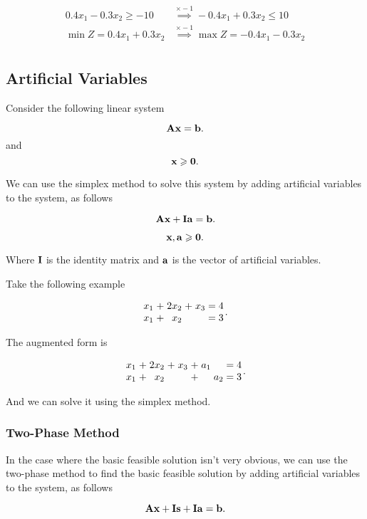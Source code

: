 \documentclass{report}
\begin{document}
\begin{align*}
	0.4x_1 - 0.3x_2 \geq -10 & \overset{\times -1}{\implies} -0.4x_1 + 0.3x_2 \leq 10  \\
	\min Z = 0.4x_1 + 0.3x_2 & \overset{\times -1}{\implies} \max Z = -0.4x_1 - 0.3x_2 \\
\end{align*}

\subsection{Artificial Variables}

Consider the following linear system

\[
	\vb{A}\vb{x} = \vb{b}
	.\]
and
\[
	\vb{x} \geqslant \vb{0}
	.\]

We can use the simplex method to solve this system by adding artificial variables to the system, as follows

\[
	\vb{A}\vb{x} + \vb{I}\vb{a} = \vb{b}
	.\]

\[
	\vb{x}, \vb{a} \geqslant \vb{0}
	.\]

Where $\vb{I}$ is the identity matrix and $\vb{a}$ is the vector of artificial variables.

Take the following example

\[
	\arraycolsep=1.4pt
	\begin{array}{rrrrrrr}
		x_1 & + & 2x_2 & + & x_3 & = & 4 \\
		x_1 & + & x_2  &   &     & = & 3
	\end{array}
	.\]

The augmented form is

\[
	\arraycolsep=1.4pt
	\begin{array}{rrrrrrrrrr}
		x_1 & + & 2x_2 & + & x_3 & + & a_1 &     & = & 4 \\
		x_1 & + & x_2  &   &     & + &     & a_2 & = & 3
	\end{array}
	.\]

And we can solve it using the simplex method.

\subsubsection{Two-Phase Method}

In the case where the basic feasible solution isn't very obvious, we can use the two-phase method to find the basic feasible solution by adding artificial variables to the system, as follows

\[
	\vb{A}\vb{x} + \vb{I}\vb{s} + \vb{I}\vb{a} = \vb{b}
	.\]
\end{document}
